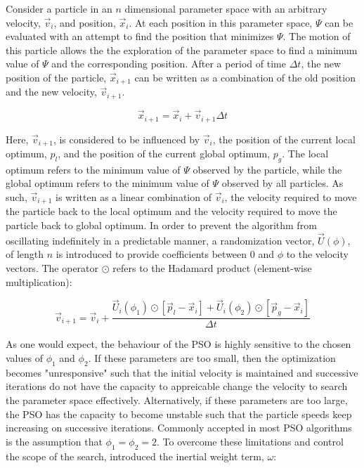 Consider a particle in an $n$ dimensional parameter space with an arbitrary velocity, $\vec{v}_i$, and position, $\vec{x}_i$. At each position in this parameter space, $\Psi$ can be evaluated with an attempt to find the position that minimizes $\Psi$. The motion of this particle allows the the exploration of the parameter space to find a minimum value of $\Psi$ and the corresponding position. After a period of time $\Delta t$, the new position of the particle, $\vec{x}_{i+1}$ can be written as a combination of the old position and the new velocity, $\vec{v}_{i+1}$. 

\begin{equation}
\vec{x}_{i+1} = \vec{x}_i + \vec{v}_{i+1} \Delta t
\label{eqn:psoupdate}
\end{equation}

Here, $\vec{v}_{i+1}$, is considered to be influenced by $\vec{v}_i$, the position of the current local optimum, $p_l$, and the position of the current global optimum, $p_g$. The local optimum refers to the minimum value of $\Psi$ observed by the particle, while the global optimum refers to the minimum value of $\Psi$ observed by all particles. As such,  $\vec{v}_{i+1}$ is written as a linear combination of $\vec{v}_{i}$, the velocity required to move the particle back to the local optimum and the velocity required to move the particle back to global optimum. In order to prevent the algorithm from oscillating indefinitely in a predictable manner, a randomization vector, $\vec{U}\left(\phi\right)$, of length $n$ is introduced to provide coefficients between 0 and $\phi$ to the velocity vectors. The operator $\odot$ refers to the Hadamard product (element-wise multiplication):

\begin{equation}
\vec{v}_{i+1} = \vec{v}_i + \frac{\vec{U}_i\left(\phi_1\right)\odot\left[\vec{p}_l-\vec{x}_i\right] + \vec{U}_i\left(\phi_2\right)\odot\left[\vec{p}_g-\vec{x}_i\right]}{\Delta t}
\label{eqn:psobasic}
\end{equation}

As one would expect, the behaviour of the PSO is highly sensitive to the chosen values of $\phi_1$ and $\phi_2$. If these parameters are too small, then the optimization becomes "unresponsive" such that the initial velocity is maintained and successive iterations do not have the capacity to appreicable change the velocity to search the parameter space effectively. Alternatively, if these parameters are too large, the PSO has the capacity to become unstable such that the particle speeds keep increasing on successive iterations. Commonly accepted in most PSO algorithms is the assumption that $\phi_1 = \phi_2 = 2$. To overcome these limitations and control the scope of the search, \citet{Shi} introduced the inertial weight term, $\omega$:

